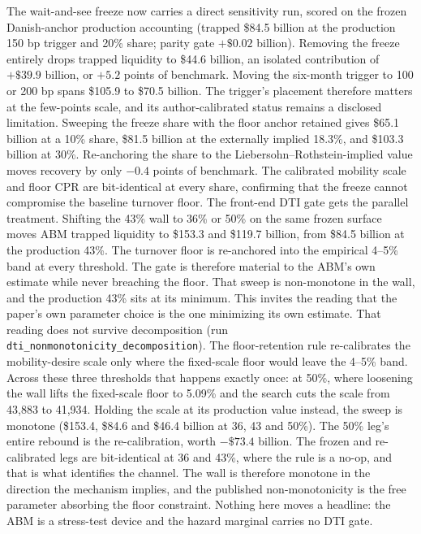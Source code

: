 \documentclass[12pt]{article}
\begin{document}
The wait-and-see freeze now carries a direct sensitivity run, scored on the frozen Danish-anchor production accounting (trapped \$84.5 billion at the production 150 bp trigger and 20\% share; parity gate $+\$0.02$ billion). Removing the freeze entirely drops trapped liquidity to \$44.6 billion, an isolated contribution of $+\$39.9$ billion, or $+5.2$ points of benchmark. Moving the six-month trigger to 100 or 200 bp spans \$105.9 to \$70.5 billion. The trigger's placement therefore matters at the few-points scale, and its author-calibrated status remains a disclosed limitation. Sweeping the freeze share with the floor anchor retained gives \$65.1 billion at a 10\% share, \$81.5 billion at the externally implied 18.3\%, and \$103.3 billion at 30\%. Re-anchoring the share to the Liebersohn--Rothstein-implied value moves recovery by only $-0.4$ points of benchmark. The calibrated mobility scale and floor CPR are bit-identical at every share, confirming that the freeze cannot compromise the baseline turnover floor. The front-end DTI gate gets the parallel treatment. Shifting the 43\% wall to 36\% or 50\% on the same frozen surface moves ABM trapped liquidity to \$153.3 and \$119.7 billion, from \$84.5 billion at the production 43\%. The turnover floor is re-anchored into the empirical 4--5\% band at every threshold. The gate is therefore material to the ABM's own estimate while never breaching the floor. That sweep is non-monotone in the wall, and the production 43\% sits at its minimum. This invites the reading that the paper's own parameter choice is the one minimizing its own estimate. That reading does not survive decomposition (run \texttt{dti\_nonmonotonicity\_decomposition}). The floor-retention rule re-calibrates the mobility-desire scale only where the fixed-scale floor would leave the 4--5\% band. Across these three thresholds that happens exactly once: at 50\%, where loosening the wall lifts the fixed-scale floor to 5.09\% and the search cuts the scale from 43{,}883 to 41{,}934. Holding the scale at its production value instead, the sweep is monotone (\$153.4, \$84.6 and \$46.4 billion at 36, 43 and 50\%). The 50\% leg's entire rebound is the re-calibration, worth $-\$73.4$ billion. The frozen and re-calibrated legs are bit-identical at 36 and 43\%, where the rule is a no-op, and that is what identifies the channel. The wall is therefore monotone in the direction the mechanism implies, and the published non-monotonicity is the free parameter absorbing the floor constraint. Nothing here moves a headline: the ABM is a stress-test device and the hazard marginal carries no DTI gate.
\end{document}
